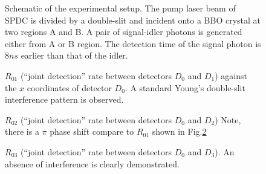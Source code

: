 \documentclass[pra,aps,epsf,12pt]{revtex4-2}
\begin{document}
\begin{figure}[tbp]
\centerline{\epsfxsize=2.7in } \caption{Schematic of the
experimental setup. The pump laser beam of SPDC is divided by a double-slit and incident
onto a BBO crystal at two regions A and B. A pair of signal-idler photons is generated
either from A or B region. The detection time of the signal photon is $8ns$ earlier than
that of the idler.}\label{fig:figure2}
\end{figure}

\begin{figure}[tbp]
\centerline{\epsfxsize=2.7in }
\caption{$R_{01}$ (``joint detection'' rate between detectors $D_{0}$ and $%
D_{1}$) against the $x$ coordinates of detector $D_{0}$. A standard Young's double-slit
interference pattern is observed.}\label{fig:figure3}
\end{figure}

\begin{figure}[tbp]
\centerline{\epsfxsize=2.7in }
\caption{$R_{02}$ (``joint detection'' rate between detectors $D_{0}$ and $%
D_{2}$) Note, there is a $\pi$ phase shift compare to $R_{01}$ shown in
Fig.\ref{fig:figure3} }\label{fig:figure4}
\end{figure}

\begin{figure}[tbp]
\centerline{\epsfxsize=2.7in }
\caption{$R_{03}$ (``joint detection'' rate between detectors $D_{0}$ and $%
D_{3}$). An absence of interference is clearly demonstrated.}\label{fig:figure5}
\end{figure}
\end{document}
